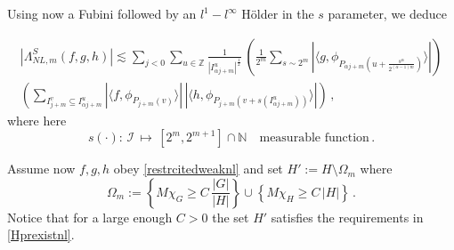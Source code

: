\documentclass[a4paper,reqno]{amsart}
\numberwithin{equation}{section}
\theoremstyle{definition}
\newcommand{\Z}{\mathbb{Z}}
\newcommand{\N}{\mathbb{N}}
\def\a{\alpha}
\def\L{\Lambda}
\def\O{\Omega}
\begin{document}
Using now a Fubini followed by an $l^1-l^{\infty}$ H\"older in the $s$ parameter, we deduce

\begin{align}\label{maxshift}
|\L^{S}_{NL,m}(f,g,h)|\lesssim \sum_{j<0}\sum_{u\in\Z}
\frac{1}{|I_{\a j+m}^u|^{\frac{1}{2}}}\,\left(\frac{1}{2^m}\sum_{s\sim 2^m} |\langle g,  \phi_{P_{\a j+m}(u+\frac{s^{\a}}{2^{(\a-1)m}})}\rangle|\right)\nonumber\\
\left(\sum_{I_{j+m}^v\subseteq I_{\a j+ m}^u}
|\langle f,  \phi_{P_{j+m}(v)}\rangle|\,|\langle h,  \phi_{P_{j+m}(v+s(I_{\a j+ m}^u))}\rangle|\right)\,,
\end{align}
where here
\begin{equation}\label{meas}
s(\cdot):\,\mathcal{I}\,\mapsto\,[2^m, 2^{m+1}]\cap \N\quad\textrm{measurable function}\,.
\end{equation}

Assume now $f,g,h$ obey \eqref{restrcitedweaknl} and set $H':=H\setminus \O_{m}$ where
\begin{equation}\label{oms}
\O_{m}:=\left\{M \chi_{G}\geq C\,\frac{|G|}{|H|}\right\}
\cup\left\{M \chi_{H}\geq C\,|H|\right\}\,.
\end{equation}
Notice that for a large enough $C>0$ the set $H'$ satisfies the requirements in \eqref{Hprexistnl}.
\end{document}
